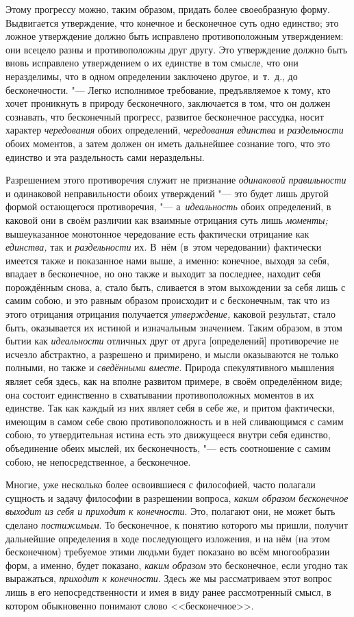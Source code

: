 Этому прогрессу можно, таким образом, придать более своеобразную форму.
Выдвигается утверждение, что конечное и бесконечное суть одно единство; это
ложное утверждение должно быть исправлено противоположным утверждением: они
всецело разны и противоположны друг другу. Это утверждение должно быть
вновь исправлено утверждением о их единстве в том смысле, что они
неразделимы, что в одном определении заключено другое, и~т.~д., до
бесконечности. "--- Легко исполнимое требование, предъявляемое к тому, кто
хочет проникнуть в природу бесконечного, заключается в том, что он должен
сознавать, что бесконечный прогресс, развитое бесконечное рассудка, носит
характер {\em чередования} обоих определений,
{\em чередования единства} и
{\em раздельности} обоих моментов, а затем должен он
иметь дальнейшее сознание того, что это единство и эта раздельность сами
нераздельны.

Разрешением этого противоречия служит не признание
{\em одинаковой правильности} и одинаковой
неправильности обоих утверждений "--- это будет лишь другой формой остающегося
противоречия, "--- а~{\em идеальность} обоих определений,
в каковой они в своём различии как взаимные отрицания суть лишь
{\em моменты;} вышеуказанное монотонное чередование
есть фактически отрицание как {\em единства,} так и
{\em раздельности} их. В~нём (в~этом чередовании)
фактически имеется также и показанное нами выше, а именно: конечное, выходя
за себя, впадает в бесконечное, но оно также и выходит за последнее,
находит себя порождённым снова, а, стало быть, сливается в этом выхождении
за себя лишь с самим собою, и это равным образом происходит и с
бесконечным, так что из этого отрицания отрицания получается
{\em утверждение,} каковой результат, стало быть,
оказывается их истиной и изначальным значением. Таким образом, в этом бытии
как {\em идеальности} отличных друг от друга
[определений] противоречие не исчезло абстрактно, а разрешено и примирено,
и мысли оказываются не только полными, но также и
{\em сведёнными вместе}. Природа спекулятивного
мышления являет себя здесь, как на вполне развитом примере, в своём
определённом виде; она состоит единственно в схватывании противоположных
моментов в их единстве. Так как каждый из них являет себя в себе же, и
притом фактически, имеющим в самом себе свою противоположность и в ней
сливающимся с самим собою, то утвердительная истина есть это движущееся
внутри себя единство, объединение обеих мыслей, их бесконечность, "--- есть
соотношение с самим собою, не непосредственное, а бесконечное.

Многие, уже несколько более освоившиеся с философией, часто полагали
сущность и задачу философии в разрешении вопроса,
{\em каким образом бесконечное выходит из себя и
приходит к конечности}. Это, полагают они, не может быть сделано
{\em постижимым}. То бесконечное, к понятию которого мы
пришли, получит дальнейшие определения в ходе последующего изложения, и на
нём (на этом бесконечном) требуемое этими людьми будет показано во всём
многообразии форм, а именно, будет показано, {\em каким
образом} это бесконечное, если угодно так выражаться,
{\em приходит к конечности}. Здесь же мы рассматриваем
этот вопрос лишь в его непосредственности и имея в виду ранее рассмотренный
смысл, в котором обыкновенно понимают слово <<бесконечное>>.


